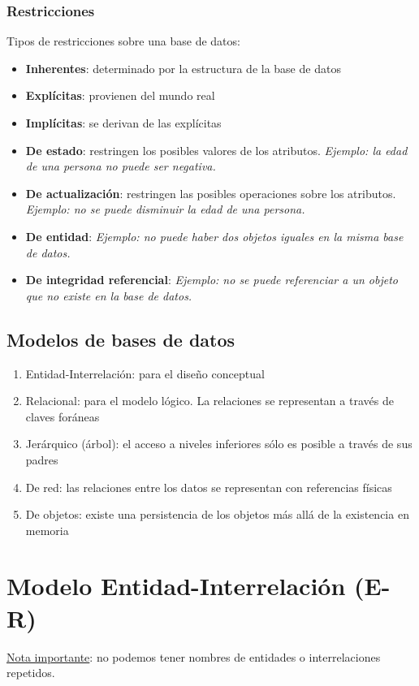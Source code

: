 \documentclass[a4paper, twoside]{article}
\begin{document}
\subsubsection{Restricciones}
Tipos de restricciones sobre una base de datos:
\begin{itemize}
	\item \textbf{Inherentes}: determinado por la estructura de la base de datos
	\item \textbf{Explícitas}: provienen del mundo real
	\item \textbf{Implícitas}: se derivan de las explícitas
	\item \textbf{De estado}: restringen los posibles valores de los atributos. \emph{Ejemplo: la edad de una persona no puede ser negativa.}
	\item \textbf{De actualización}: restringen las posibles operaciones sobre los atributos. \emph{Ejemplo: no se puede disminuir la edad de una persona.}
	\item \textbf{De entidad}: \emph{Ejemplo: no puede haber dos objetos iguales en la misma base de datos.}
	\item \textbf{De integridad referencial}: \emph{Ejemplo: no se puede referenciar a un objeto que no existe en la base de datos.}
\end{itemize}

\subsection{Modelos de bases de datos}
\begin{enumerate}
	\item Entidad-Interrelación: para el diseño conceptual
	\item Relacional: para el modelo lógico. La relaciones se representan a través de claves foráneas
	\item Jerárquico (árbol): el acceso a niveles inferiores sólo es posible a través de sus padres
	\item De red: las relaciones entre los datos se representan con referencias físicas
	\item De objetos: existe una persistencia de los objetos más allá de la existencia en memoria
\end{enumerate}

\newpage
\section{Modelo Entidad-Interrelación (E-R)}
\uline{Nota importante}: no podemos tener nombres de entidades o interrelaciones repetidos.
\end{document}
